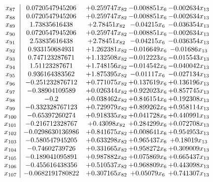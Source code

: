 \documentclass[11pt]{article}
\begin{document}
\[\begin{array}{c| c c@{\hskip 2pt} c@{\hskip 2pt} c@{\hskip 2pt} }
 x_{87}   &  0.0720547945206 & + 0.259747 x_{82} & -0.008851 x_{6} & -0.002634 x_{13}\\
 x_{88}   &  0.0720547945206 & + 0.259747 x_{82} & -0.008851 x_{6} & -0.002634 x_{13}\\
 x_{89}   &  1.73835616438 & + 2.78451 x_{82} & -0.04215 x_{6} & -0.036354 x_{13}\\
 x_{90}   &  0.0720547945206 & + 0.259747 x_{82} & -0.008851 x_{6} & -0.002634 x_{13}\\
 x_{91}   &  2.53835616438 & + 2.78451 x_{82} & -0.04215 x_{6} & -0.036354 x_{13}\\
 x_{92}   &  0.933150684931 & + 1.262381 x_{82} & -0.016649 x_{6} & -0.01686 x_{13}\\
 x_{93}   &  0.747123287671 & + 1.132508 x_{82} & -0.012223 x_{6} & -0.015543 x_{13}\\
 x_{94}   &  1.51123287671 & + 1.748156 x_{82} & -0.014542 x_{6} & -0.040042 x_{13}\\
 x_{95}   &  0.936164383562 & + 1.875395 x_{82} & -0.01117 x_{6} & -0.027134 x_{13}\\
 x_{96}   &  -0.251232876712 & + 0.771075 x_{82} & + 0.137619 x_{6} & + 0.136196 x_{13}\\
 x_{97}   &  -0.38904109589 & + 0.026344 x_{82} & + 0.922023 x_{6} & + 0.857745 x_{13}\\
 x_{98}   &  -0.2 & + 0.038462 x_{82} & + 0.846154 x_{6} & + 0.192308 x_{13}\\
 x_{99}   &  -0.332328767123 & + 0.729979 x_{82} & + 0.899262 x_{6} & + 0.958114 x_{13}\\
 x_{100}   &  -0.65397260274 & + 0.918335 x_{82} & + 0.041728 x_{6} & + 0.440991 x_{13}\\
 x_{101}   &  -0.216712328767 & + 0.43098 x_{82} & + 0.284299 x_{6} & + 0.072708 x_{13}\\
 x_{102}   &  -0.0298630136986 & + 0.841675 x_{82} & + 0.008641 x_{6} & + 0.954953 x_{13}\\
 x_{103}   &  -0.580547945205 & + 0.633298 x_{82} & + 0.965437 x_{6} & + 0.18019 x_{13}\\
 x_{104}   &  -0.74602739726 & + 0.331665 x_{82} & + 0.958272 x_{6} & + 0.309009 x_{13}\\
 x_{105}   &  -0.189041095891 & + 0.987882 x_{82} & + 0.075869 x_{6} & + 0.665437 x_{13}\\
 x_{106}   &  -0.455616438356 & + 0.510537 x_{82} & + 0.968809 x_{6} & + 0.443098 x_{13}\\
 x_{107}   &  -0.0682191780822 & + 0.307165 x_{82} & + 0.05079 x_{6} & + 0.741307 x_{13}\\

\end{array}\]
\end{document}
